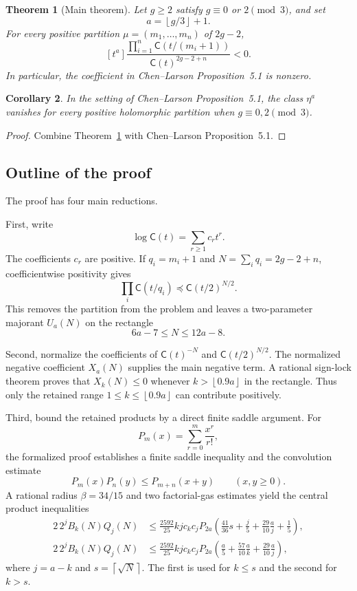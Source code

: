 \documentclass[11pt]{article}
\newtheorem{theorem}{Theorem}[section]
\newtheorem{corollary}[theorem]{Corollary}
\theoremstyle{definition}
\theoremstyle{remark}
\newcommand{\C}{\mathsf C}
\newcommand{\floor}[1]{\left\lfloor #1\right\rfloor}
\newcommand{\ceil}[1]{\left\lceil #1\right\rceil}
\begin{document}
\begin{theorem}[Main theorem]\label{thm:main}
Let $g\ge2$ satisfy $g\equiv0$ or $2\pmod 3$, and set
\[
  a=\floor{g/3}+1.
\]
For every positive partition $\mu=(m_1,\ldots,m_n)$ of $2g-2$,
\begin{equation}\label{eq:main-neg}
  [t^a]\frac{\prod_{i=1}^n\C(t/(m_i+1))}
                   {\C(t)^{2g-2+n}}<0.
\end{equation}
In particular, the coefficient in Chen--Larson Proposition~5.1 is nonzero.
\end{theorem}

\begin{corollary}\label{cor:geometric}
In the setting of Chen--Larson Proposition~5.1, the class $\eta^a$ vanishes
for every positive holomorphic partition when $g\equiv0,2\pmod3$.
\end{corollary}

\begin{proof}
Combine Theorem~\ref{thm:main} with Chen--Larson Proposition~5.1.
\end{proof}

\subsection{Outline of the proof}

The proof has four main reductions.

First, write
\[
  \log \C(t)=\sum_{r\ge1}c_rt^r.
\]
The coefficients $c_r$ are positive.  If $q_i=m_i+1$ and
$N=\sum_iq_i=2g-2+n$, coefficientwise positivity gives
\[
  \prod_i\C(t/q_i)\preceq \C(t/2)^{N/2}.
\]
This removes the partition from the problem and leaves a two-parameter
majorant $U_a(N)$ on the rectangle
\[
  6a-7\le N\le12a-8.
\]

Second, normalize the coefficients of $\C(t)^{-N}$ and
$\C(t/2)^{N/2}$.  The normalized negative coefficient $X_a(N)$ supplies the
main negative term.  A rational sign-lock theorem proves that
$X_k(N)\le0$ whenever $k>\floor{0.9a}$ in the rectangle.  Thus only the
retained range $1\le k\le\floor{0.9a}$ can contribute positively.

Third, bound the retained products by a direct finite saddle argument.  For
\[
  P_m(x)=\sum_{r=0}^m\frac{x^r}{r!},
\]
the formalized proof establishes a finite saddle inequality and the
convolution estimate
\[
  P_m(x)P_n(y)\le P_{m+n}(x+y)\qquad(x,y\ge0).
\]
A rational radius $\beta=34/15$ and two factorial-gas estimates yield the
central product inequalities
\begin{align*}
  2\,2^j B_k(N)Q_j(N)
  &\le \frac{2592}{25}kjc_kc_j
   P_{2a}\left(\frac{41}{36}s+\frac j5+
      \frac{29}{10}\frac aj+\frac15\right),\\
  2\,2^j B_k(N)Q_j(N)
  &\le \frac{2592}{25}kjc_kc_j
   P_{2a}\left(\frac a5+\frac{57}{10}\frac ak+
      \frac{29}{10}\frac aj\right),
\end{align*}
where $j=a-k$ and $s=\ceil{\sqrt N}$.  The first is used for $k\le s$ and
the second for $k>s$.
\end{document}
